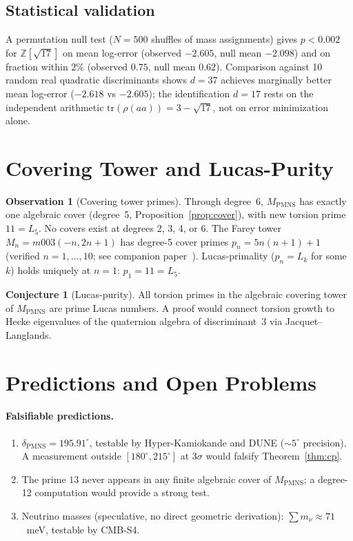 \documentclass[11pt,a4paper]{article}
\theoremstyle{definition}
\newtheorem{observation}[theorem]{Observation}
\newtheorem{conjecture}[theorem]{Conjecture}
\theoremstyle{remark}
\newcommand{\MPMNS}{M_{\mathrm{PMNS}}}
\newcommand{\Zsev}{\mathbb{Z}[\sqrt{17}]}
\begin{document}
\subsection{Statistical validation}

A permutation null test ($N=500$ shuffles of mass assignments) gives
$p<0.002$ for $\Zsev$ on mean log-error
(observed $-2.605$, null mean $-2.098$) and on fraction within $2\%$
(observed $0.75$, null mean $0.62$).
Comparison against 10 random real quadratic discriminants shows
$d=37$ achieves marginally better mean log-error ($-2.618$ vs
$-2.605$); the identification $d=17$ rests on the independent
arithmetic $\mathrm{tr}(\rho(aa))=3-\sqrt{17}$, not on
error minimization alone.

\section{Covering Tower and Lucas-Purity}
\label{sec:covering}

\begin{observation}[Covering tower primes]
\label{obs:tower}
Through degree~6, $\MPMNS$ has exactly one algebraic cover
(degree~5, Proposition~\ref{prop:cover}), with new torsion prime
$11=L_5$.
No covers exist at degrees 2, 3, 4, or 6.
The Farey tower $M_n = m003(-n,2n+1)$ has degree-5 cover primes
$p_n = 5n(n+1)+1$ (verified $n=1,\ldots,10$;
see companion paper~\cite{Gentry:Farey}).
Lucas-primality ($p_n = L_k$ for some $k$) holds uniquely at $n=1$:
$p_1 = 11 = L_5$.
\end{observation}

\begin{conjecture}[Lucas-purity]
\label{conj:lucas}
All torsion primes in the algebraic covering tower of $\MPMNS$
are prime Lucas numbers.
A proof would connect torsion growth to Hecke eigenvalues
of the quaternion algebra of discriminant~3 via Jacquet--Langlands.
\end{conjecture}

\section{Predictions and Open Problems}
\label{sec:predictions}

\paragraph{Falsifiable predictions.}
\begin{enumerate}[(1)]
\item $\delta_{\mathrm{PMNS}} = 195.91^\circ$, testable by
  Hyper-Kamiokande and DUNE ($\sim5^\circ$ precision).
  A measurement outside $[180^\circ,215^\circ]$ at $3\sigma$
  would falsify Theorem~\ref{thm:cp}.
\item The prime $13$ never appears in any finite algebraic
  cover of $\MPMNS$; a degree-12 computation would provide
  a strong test.
\item Neutrino masses (speculative, no direct geometric derivation):
  $\sum m_\nu\approx71$~meV, testable by CMB-S4.
\end{enumerate}
\end{document}
